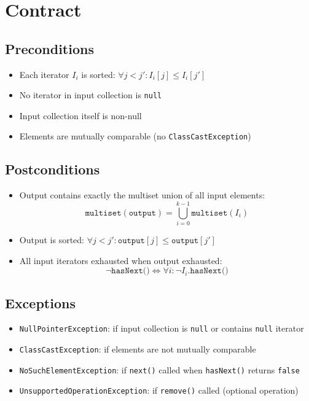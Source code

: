 \documentclass[11pt]{article}
\begin{document}
\section{Contract}

\subsection{Preconditions}

\begin{itemize}
    \item Each iterator $I_i$ is sorted: $\forall j < j': I_i[j] \leq I_i[j']$
    \item No iterator in input collection is \texttt{null}
    \item Input collection itself is non-null
    \item Elements are mutually comparable (no \texttt{ClassCastException})
\end{itemize}

\subsection{Postconditions}

\begin{itemize}
    \item Output contains exactly the multiset union of all input elements:
    \[
    \texttt{multiset}(\texttt{output}) = \bigcup_{i=0}^{k-1} \texttt{multiset}(I_i)
    \]
    \item Output is sorted: $\forall j < j': \texttt{output}[j] \leq \texttt{output}[j']$
    \item All input iterators exhausted when output exhausted:
    \[
    \neg \texttt{hasNext()} \Leftrightarrow \forall i: \neg I_i.\texttt{hasNext()}
    \]
\end{itemize}

\subsection{Exceptions}

\begin{itemize}
    \item \texttt{NullPointerException}: if input collection is \texttt{null} or contains \texttt{null} iterator
    \item \texttt{ClassCastException}: if elements are not mutually comparable
    \item \texttt{NoSuchElementException}: if \texttt{next()} called when \texttt{hasNext()} returns \texttt{false}
    \item \texttt{UnsupportedOperationException}: if \texttt{remove()} called (optional operation)
\end{itemize}
\end{document}
